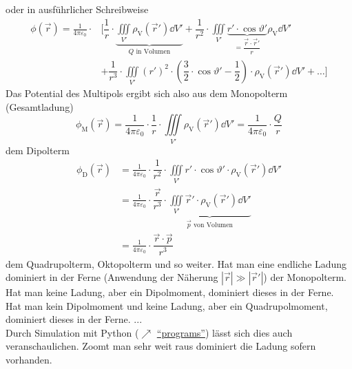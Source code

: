 	  oder in ausführlicher Schreibweise
	  \begin{equation}\label{multi}
		  \begin{split}
			  \phi(\vec{r} ) = \frac{1}{4\pi\varepsilon_0} \cdot	&\Biggl[ \dfrac{1}{r} \cdot
			  \underbrace{\iiint\limits_{V'} \rho_\text{V}(\vec{r}' ) \dd V'}_{ Q \text{ in Volumen}}
			  + \dfrac{1}{r^2} \cdot \iiint\limits_{V'} \underbrace{ r' \cdot \cos \vartheta'}_{=\dfrac{\vec{r}  \cdot \vec{r}' }{r}} \rho_\text{V} \dd V' \\
			  &+ \dfrac{1}{r^3} \cdot \iiint\limits_{V'} ( r')^2 \cdot \left( \dfrac{3}{2} \cdot \cos \vartheta' - \dfrac{1}{2} \right) \cdot \rho_\text{V}(\vec{r}' ) \dd V' + \dots \Biggr]
		  \end{split}
	  \end{equation}
	  Das Potential des Multipols ergibt sich also aus dem Monopolterm (Gesamtladung)
	  \begin{equation}
		  \phi_\mathrm{M}(\vec{r} )
		  = \frac{1}{4\pi\varepsilon_0} \cdot \dfrac{1}{r} \cdot \iiint\limits_{V'} \rho_\text{V}(\vec{r}' ) \dd V'
		  = \frac{1}{4\pi\varepsilon_0} \cdot \dfrac{ Q}{r}
	  \end{equation}
	  dem Dipolterm
	  \begin{equation}\begin{split}
			  \phi_\mathrm{D}(\vec{r} )
			  &= \frac{1}{4\pi\varepsilon_0} \cdot \dfrac{1}{r^2} \cdot \iiint\limits_{V'}  r' \cdot \cos \vartheta' \cdot \rho_\text{V}(\vec{r}' ) \dd V'\\
			  &= \frac{1}{4\pi\varepsilon_0} \cdot \dfrac{\vec{r} }{r^3} \cdot
			  \underbrace{\iiint\limits_{V'} \vec{r}'  \cdot \rho_\text{V}(\vec{r}' ) \dd V'}_{\vec{p} \text{ von Volumen}}\\
			  &= \frac{1}{4\pi\varepsilon_0} \cdot \dfrac{\vec{r}  \cdot \vec{p}}{r^3}
		  \end{split}\end{equation}
	  dem Quadrupolterm, Oktopolterm und so weiter. Hat man eine endliche Ladung dominiert in der Ferne (Anwendung der Näherung \(\left| \vec{r}  \right| \gg \left| \vec{r}'  \right| \)) der Monopolterm. Hat man keine Ladung, aber ein Dipolmoment, dominiert dieses in der Ferne. Hat man kein Dipolmoment und keine Ladung, aber ein Quadrupolmoment, dominiert dieses in der Ferne. ...\\
	  Durch Simulation mit Python ($\nearrow$ \href{https://github.com/hgkdd/TET/tree/main/programs}{\enquote{programs}}) lässt sich dies auch veranschaulichen. Zoomt man sehr weit raus dominiert die Ladung sofern vorhanden.
